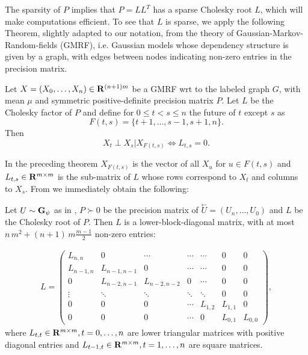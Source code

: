 The sparsity of $P$ implies that $P = LL^{T}$ has a sparse Cholesky root $L$, which will make computations efficient. 
To see that $L$ is sparse, we apply the following Theorem, slightly adapted to our notation, from the theory of Gaussian-Markov-Random-fields (GMRF), i.e. Gaussian models whose dependency structure is given by a graph, with edges between nodes indicating non-zero entries in the precision matrix.
\begin{theorem} 
    \label{thm:gelfand_gmrf}
    Let $X = (X_{0}, \dots, X_{n}) \in \mathbf R^{(n + 1)m}$ be a GMRF wrt to the labeled graph $G$, with mean $\mu$ and symmetric positive-definite precision matrix $P$. Let $L$ be the Cholesky factor of $P$ and define for $0 \leq t < s \leq n$ the future of $t$ except $s$ as 
    $$
        F(t,s) = \{t + 1, \dots, s - 1, s+ 1, n\}.
    $$
    Then
    $$
        X_{t} \perp X_{s} | X_{F(t,s)} \Leftrightarrow L_{t,s} = 0.
    $$
\end{theorem}
In the preceding theorem $X_{F(t,s)}$ is the vector of all $X_{u}$ for $u\in F(t,s)$ and $L_{t,s} \in \mathbf R^{m\times m}$ is the sub-matrix of $L$  whose rows correspond to $X_{t}$ and columns to $X_{s}$. 
From  we immediately obtain the following:

\begin{corollary}
    \label{cor:sparsity_L}
    Let $U \sim \mathbf G_{\psi}$ as in , $P \succ 0$ be the precision matrix of $\overset{\leftarrow}{U} = \left( U_{n}, \dots, U_{0} \right)$ and $L$ be the Cholesky root of $P$. 
    Then $L$ is a lower-block-diagonal matrix, with at most $n\,m^{2} + (n + 1)\,m\frac{m - 1}{2}$ non-zero entries:
    
    \begin{align}
        \label{eq:L_structure}
    L = \begin{pmatrix}
        L_{n,n} & 0 & \cdots & \cdots & \cdots & 0 & 0 \\
        L_{n-1, n} & L_{n-1,n-1} & 0 & \cdots & \cdots & 0 & 0\\
        0 & L_{n-2,n-1} & L_{n-2,n-2} & 0 & \cdots & 0 & 0 \\
        \vdots & \ddots & \ddots  & \ddots & \ddots & 0 & 0 \\
        0 & 0& 0& \cdots& L_{1, 2}& L_{1, 1} & 0 \\
        0 & 0 & 0 & \cdots & 0 & L_{0, 1} & L_{0,0} 
    \end{pmatrix},
    \end{align}
    where $L_{t,t} \in \mathbf R^{m\times m}, t = 0, \dots, n$ are lower triangular matrices with positive diagonal entries and $L_{t-1,t}\in\mathbf R^{m \times m}, t = 1, \dots, n$ are square matrices.
\end{corollary}

